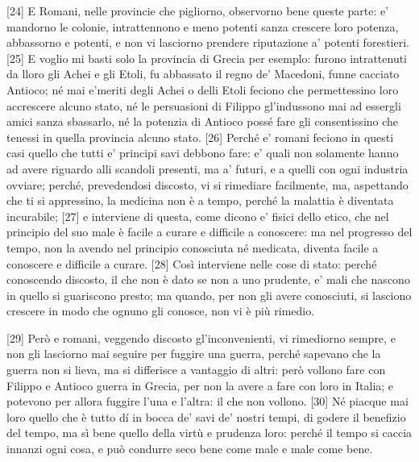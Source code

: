 {[}24{]} E Romani, nelle provincie che pigliorno, observorno bene queste
parte: e' mandorno le colonie, intrattennono e meno potenti sanza
crescere loro potenza, abbassorno e potenti, e non vi lasciorno prendere
riputazione a' potenti forestieri. {[}25{]} E voglio mi basti solo la
provincia di Grecia per esemplo: furono intrattenuti da lloro gli Achei
e gli Etoli, fu abbassato il regno de' Macedoni, funne cacciato Antioco;
né mai e'meriti degli Achei o delli Etoli feciono che permettessino loro
accrescere alcuno stato, né le persuasioni di Filippo gl'indussono mai
ad essergli amici sanza sbassarlo, né la potenzia di Antioco possé fare
gli consentissino che tenessi in quella provincia alcuno stato. {[}26{]}
Perché e' romani feciono in questi casi quello che tutti e' principi
savi debbono fare: e' quali non solamente hanno ad avere riguardo alli
scandoli presenti, ma a' futuri, e a quelli con ogni industria ovviare;
perché, prevedendosi discosto, vi si rimediare facilmente, ma,
aspettando che ti si appressino, la medicina non è a tempo, perché la
malattia è diventata incurabile; {[}27{]} e interviene di questa, come
dicono e' fisici dello etico, che nel principio del suo male è facile a
curare e difficile a conoscere: ma nel progresso del tempo, non la
avendo nel principio conosciuta né medicata, diventa facile a conoscere
e difficile a curare. {[}28{]} Così interviene nelle cose di stato:
perché conoscendo discosto, il che non è dato se non a uno prudente, e'
mali che nascono in quello si guariscono presto; ma quando, per non gli
avere conosciuti, si lasciono crescere in modo che ognuno gli conosce,
non vi è più rimedio.

{[}29{]} Però e romani, veggendo discosto gl'inconvenienti, vi
rimediorno sempre, e non gli lasciorno mai seguire per fuggire una
guerra, perché sapevano che la guerra non si lieva, ma si differisce a
vantaggio di altri: però vollono fare con Filippo e Antioco guerra in
Grecia, per non la avere a fare con loro in Italia; e potevono per
allora fuggire l'una e l'altra: il che non vollono. {[}30{]} Né piacque
mai loro quello che è tutto dí in bocca de' savi de' nostri tempi, di
godere il benefizio del tempo, ma sì bene quello della virtù e prudenza
loro: perché il tempo si caccia innanzi ogni cosa, e può condurre seco
bene come male e male come bene.

